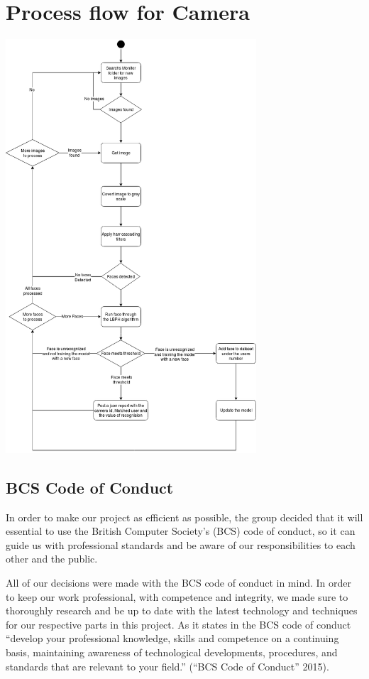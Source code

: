 \documentclass[
  english,
  a4paper,
,tablecaptionabove
]{scrartcl}
\begin{document}
\newpage

\hypertarget{process-flow-for-camera}{%
\section{Process flow for Camera}\label{process-flow-for-camera}}

\includegraphics[width=0.7\textwidth,height=\textheight]{images/ppm-images/camera-flow.png}

\newpage

\hypertarget{bcs-code-of-conduct}{%
\subsection{BCS Code of Conduct}\label{bcs-code-of-conduct}}

In order to make our project as efficient as possible, the group decided
that it will essential to use the British Computer Society's (BCS) code
of conduct, so it can guide us with professional standards and be aware
of our responsibilities to each other and the public.

All of our decisions were made with the BCS code of conduct in mind. In
order to keep our work professional, with competence and integrity, we
made sure to thoroughly research and be up to date with the latest
technology and techniques for our respective parts in this project. As
it states in the BCS code of conduct \enquote{develop your professional
knowledge, skills and competence on a continuing basis, maintaining
awareness of technological developments, procedures, and standards that
are relevant to your field.} (``BCS Code of Conduct'' 2015).
\end{document}
